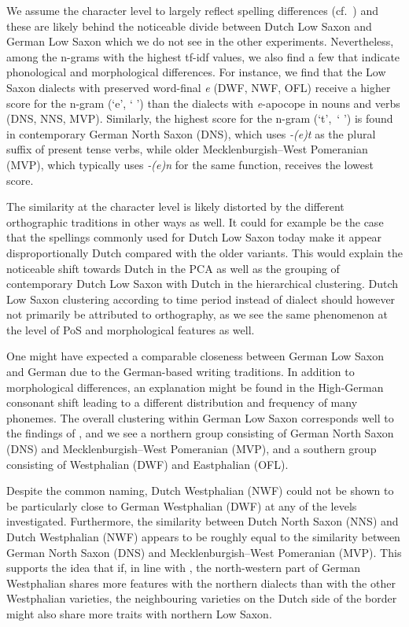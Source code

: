 \documentclass[output=paper,colorlinks,citecolor=brown]{langscibook}
\begin{document}
We assume the character level to largely reflect spelling differences (cf.~) and these are likely behind the noticeable divide between Dutch Low Saxon and German Low Saxon which we do not see in the other experiments. Nevertheless, among the n-grams with the highest tf-idf values, we also find a few that indicate phonological and morphological differences. For instance, we find that the Low Saxon dialects with preserved word-final \textit{e} (DWF, NWF, OFL) receive a higher score for the n-gram (`e', ` ') than the dialects with \textit{e}-apocope in nouns and verbs (DNS, NNS, MVP). Similarly, the highest score for the n-gram (`t',~` ') is found in contemporary German North Saxon (DNS), which uses \textit{-(e)t} as the plural suffix of present tense verbs, while older Mecklenburgish--West Pomeranian (MVP), which typically uses \textit{-(e)n} for the same function, receives the lowest score.

The similarity at the character level is likely distorted by the different orthographic traditions in other ways as well. It could for example be the case that the spellings commonly used for Dutch Low Saxon today make it appear disproportionally Dutch compared with the older variants. This would explain the noticeable shift towards Dutch in the PCA as well as the grouping of contemporary Dutch Low Saxon with Dutch in the hierarchical clustering. Dutch Low Saxon clustering according to time period instead of dialect should however not primarily be attributed to orthography, as we see the same phenomenon at the level of PoS and morphological features as well. 

\begin{sloppypar}
One might have expected a comparable closeness between German Low Saxon and German due to the German-based writing traditions. In addition to morphological differences, an explanation might be found in the High-German consonant shift leading to a different distribution and frequency of many phonemes. The overall clustering within German Low Saxon corresponds well to the findings of \citet{Lameli2016}, and we see a northern group consisting of German North Saxon (DNS) and Mecklenburgish--West Pomeranian (MVP), and a southern group consisting of Westphalian (DWF) and Eastphalian (OFL).
\end{sloppypar}

Despite the common naming, Dutch Westphalian (NWF) could not be shown to be particularly close to German Westphalian (DWF) at any of the levels investigated. Furthermore, the similarity between Dutch North Saxon (NNS) and Dutch Westphalian (NWF) appears to be roughly equal to the similarity between German North Saxon (DNS) and Mecklenburgish--West Pomeranian (MVP). This supports the idea that if, in line with \citet{Lameli2016}, the north-western part of German Westphalian shares more features with the northern dialects than with the other Westphalian varieties, the neighbouring varieties on the Dutch side of the border might also share more traits with northern Low Saxon. 
\end{document}
